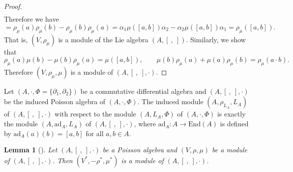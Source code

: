 \documentclass[10pt,a4paper]{amsart}
\numberwithin{equation}{section}
\newtheorem{Lemma}[Theorem]{Lemma}
\newcommand{\ad}{\mathrm{ad}}
\newcommand{\End}{\mathrm{End}}
\begin{document}
\begin{proof}
\begin{equation*}
\begin{aligned}
 \end{aligned}
 \end{equation*}
 Therefore we have
 \begin{equation*}
 [\rho_\mu(a), \rho_\mu(b)] = \rho_\mu(a)\rho_\mu(b) - \rho_\mu(b)\rho_\mu(a) = \alpha_1 \mu([a,b]) \alpha_2 - \alpha_2 \mu([a,b]) \alpha_1 = \rho_\mu([a,b]).
 \end{equation*}
 That is, $(V, \rho_\mu)$ is a module of the Lie algebra $(A, [\ ,\ ])$.
 Similarly, we show that
 \begin{equation*}
 \rho_\mu(a)\mu(b) - \mu(b)\rho_\mu(a) = \mu([a,b]), \qquad \mu(b)\rho_\mu(a) + \mu(a) \rho_\mu(b) = \rho_\mu(a \cdot b).
 \end{equation*}
 Therefore $(V, \rho_\mu, \mu)$ is a module of $(A, [\ ,\ ], \cdot)$.
\end{proof}

\begin{Example} Let $(A, \cdot, \Phi = \{\partial_1, \partial_2\})$ be a commutative differential algebra and $(A, [\ ,\ ], \cdot)$ be the induced Poisson algebra of $(A, \cdot, \Phi)$.
 The induced module $(A, \rho_{L_A}, L_A)$ of $(A, [\ ,\ ], \cdot)$
 with respect to the module $(A, L_A, \Phi)$ of $(A, \cdot, \Phi)$
 is exactly the module $(A, \ad_A, L_A)$ of $(A, [\ ,\ ], \cdot)$,
 where $\ad_A\colon A \to \End(A)$ is defined by $\ad_A(a)(b) = [a, b]$ for all $a, b \in A$.
\end{Example}

\begin{Lemma}[{\cite[Proposition~2.5]{liu2020noncommutative}}]
 Let $(A, [\ ,\ ], \cdot)$ be a Poisson algebra and $(V, \rho, \mu)$ be a module of $(A, [\ ,\ ], \cdot)$.
 Then $(V^*, -\rho^*, \mu^*)$ is a module of $(A, [\ ,\ ], \cdot)$.
\end{Lemma}
\end{document}
